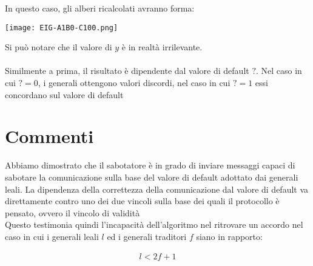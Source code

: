 \documentclass{article}
\begin{document}
In questo caso, gli alberi ricalcolati avranno forma:

\begin{center}
    \texttt{[image: EIG-A1B0-C100.png]}
\end{center}

Si può notare che il valore di $y$ è in realtà irrilevante.\\
\\
Similmente a prima, il risultato è dipendente dal valore di default $?$. Nel caso in cui $?=0$, i generali ottengono valori discordi, nel caso in cui $? = 1$ essi concordano sul valore di default \\

\section{Commenti}

Abbiamo dimostrato che il sabotatore è in grado di inviare messaggi capaci di sabotare la comunicazione sulla base del valore di default adottato dai generali leali.
La dipendenza della correttezza della comunicazione dal valore di default va direttamente contro uno dei due vincoli sulla base dei quali il protocollo è pensato, ovvero il vincolo di validità\\

Questo testimonia quindi l'incapacità dell'algoritmo nel ritrovare un accordo nel caso in cui i generali leali $l$ ed i generali traditori $f$ siano in rapporto:

\begin{align*}
    l < 2f + 1
\end{align*}
\end{document}
